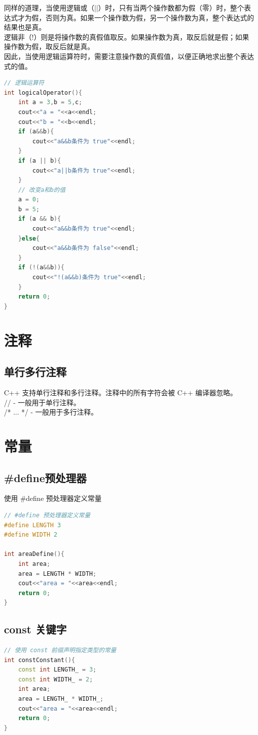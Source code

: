 \documentclass[12pt,twiside,a4paper]{ctexbook}
\numberwithin{chapter}{part}
\begin{document}
同样的道理，当使用逻辑或（||）时，只有当两个操作数都为假（零）时，整个表达式才为假，否则为真。如果一个操作数为假，另一个操作数为真，整个表达式的结果也是真。\\
逻辑非（!）则是将操作数的真假值取反。如果操作数为真，取反后就是假；如果操作数为假，取反后就是真。\\
因此，当使用逻辑运算符时，需要注意操作数的真假值，以便正确地求出整个表达式的值。
\begin{lstlisting}[language=C++]
// 逻辑运算符
int logicalOperator(){
	int a = 3,b = 5,c;
	cout<<"a = "<<a<<endl;
	cout<<"b = "<<b<<endl;
	if (a&&b){
		cout<<"a&&b条件为 true"<<endl;
	}
	if (a || b){
		cout<<"a||b条件为 true"<<endl;
	}
	// 改变a和b的值
	a = 0;
	b = 5;
	if (a && b){
		cout<<"a&&b条件为 true"<<endl;
	}else{
		cout<<"a&&b条件为 false"<<endl;
	}
	if (!(a&&b)){
		cout<<"!(a&&b)条件为 true"<<endl;
	}
	return 0;
}
\end{lstlisting}

\chapter{注释}
\section{单行多行注释}
C++ 支持单行注释和多行注释。注释中的所有字符会被 C++ 编译器忽略。\\
// - 一般用于单行注释。\\
/* ... */ - 一般用于多行注释。

\chapter{常量}
\section{\#define预处理器}
使用 \#define 预处理器定义常量
\begin{lstlisting}[language=C++]
// #define 预处理器定义常量
#define LENGTH 3
#define WIDTH 2

int areaDefine(){
	int area;
	area = LENGTH * WIDTH;
	cout<<"area = "<<area<<endl;
	return 0;
}
\end{lstlisting}

\section{const 关键字}
\begin{lstlisting}[language=C++]
// 使用 const 前缀声明指定类型的常量
int constConstant(){
	const int LENGTH_ = 3;
	const int WIDTH_ = 2;
	int area;
	area = LENGTH_ * WIDTH_;
	cout<<"area = "<<area<<endl; 
	return 0;
}
\end{lstlisting}
\end{document}
